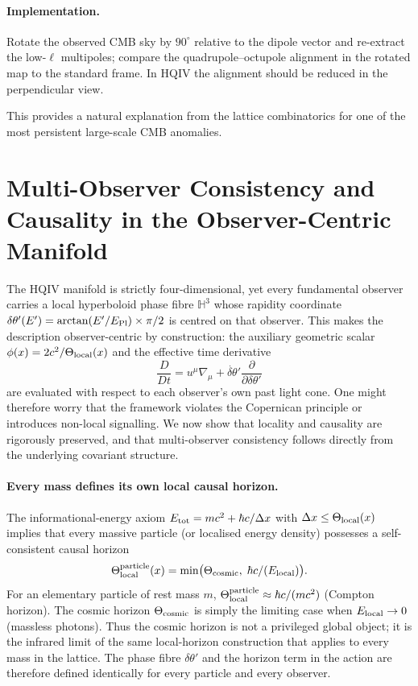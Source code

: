 \documentclass[12pt,a4paper]{article}
\begin{document}
\paragraph{Implementation.} Rotate the observed CMB sky by \(90^\circ\) relative to the dipole vector and re-extract the low-\(\ell\) multipoles; compare the quadrupole--octupole alignment in the rotated map to the standard frame. In HQIV the alignment should be reduced in the perpendicular view.

This provides a natural explanation from the lattice combinatorics for one of the most persistent large-scale CMB anomalies.

\section{Multi-Observer Consistency and Causality in the Observer-Centric Manifold}
\label{sec:multi-observer}

The HQIV manifold is strictly four-dimensional, yet every fundamental observer carries a local hyperboloid phase fibre \(\mathbb{H}^3\) whose rapidity coordinate \(\delta\theta'(E') = \arctan(E'/E_{\rm Pl})\times\pi/2\) is centred on that observer. This makes the description observer-centric by construction: the auxiliary geometric scalar \(\phi(x) = 2c^2/\Theta_{\rm local}(x)\) and the effective time derivative
\[
\frac{D}{Dt} = u^\mu\nabla_\mu + \dot{\delta\theta}' \frac{\partial}{\partial\delta\theta'}
\]
are evaluated with respect to each observer's own past light cone. One might therefore worry that the framework violates the Copernican principle or introduces non-local signalling. We now show that locality and causality are rigorously preserved, and that multi-observer consistency follows directly from the underlying covariant structure.

\paragraph{Every mass defines its own local causal horizon.}
The informational-energy axiom \(E_{\rm tot} = mc^2 + \hbar c/\Delta x\) with \(\Delta x\le\Theta_{\rm local}(x)\) implies that every massive particle (or localised energy density) possesses a self-consistent causal horizon
\[
\Theta_{\rm local}^{\rm particle}(x) = \min\bigl(\Theta_{\rm cosmic},\; \hbar c/(E_{\rm local})\bigr).
\]
For an elementary particle of rest mass \(m\), \(\Theta_{\rm local}^{\rm particle} \approx \hbar c/(mc^2)\) (Compton horizon). The cosmic horizon \(\Theta_{\rm cosmic}\) is simply the limiting case when \(E_{\rm local}\to0\) (massless photons). Thus the cosmic horizon is not a privileged global object; it is the infrared limit of the same local-horizon construction that applies to every mass in the lattice. The phase fibre \(\delta\theta'\) and the horizon term in the action are therefore defined identically for every particle and every observer.
\end{document}

